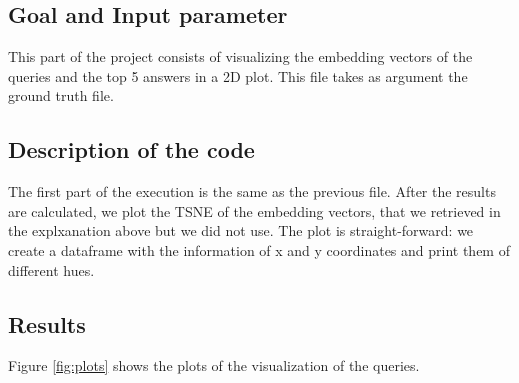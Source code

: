 \documentclass [14 pt]{article}
\begin{document}
\subsection{Goal and Input parameter} %
This part of the project consists of visualizing the embedding vectors of the queries and the top 5 answers in a 2D plot.
This file takes as argument the ground truth file.

\subsection{Description of the code} %
The first part of the execution is the same as the previous file. After the results are calculated, we plot the TSNE of the embedding vectors, that we retrieved in the explxanation above but we did not use. The plot is straight-forward: we create a dataframe with the information of x and y coordinates and print them of different hues.
\subsection{Results} %
Figure \ref{fig:plots} shows the plots of the visualization of the queries.
\end{document}
